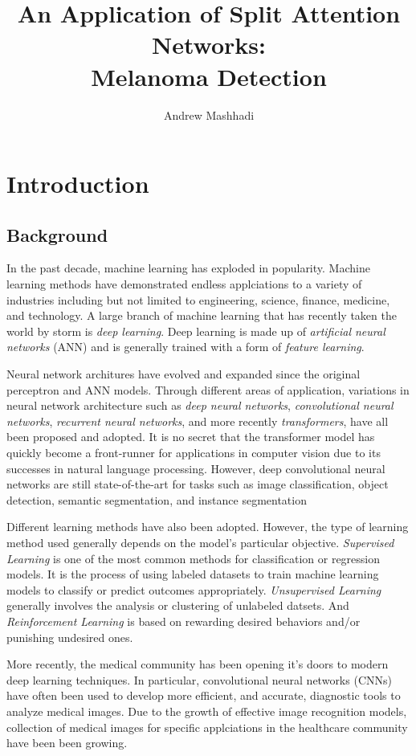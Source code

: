 \documentclass [MAS] {uclathes}
\title          {An Application of Split Attention Networks:\\
                Melanoma Detection}
\author         {Andrew Mashhadi}
\begin{document}
\makeintropages


\chapter{Introduction}

\section{Background}

In the past decade, machine learning has exploded in popularity. Machine learning methods have demonstrated endless applciations to a variety of industries including but not limited to engineering, science, finance, medicine, and technology. A large branch of machine learning that has recently taken the world by storm is \textit{deep learning}. Deep learning is made up of \textit{artificial neural networks} (ANN) and is generally trained with a form of \textit{feature learning}. 

Neural network architures have evolved and expanded since the original perceptron and ANN models. Through different areas of application, variations in neural network architecture such as \textit{deep neural networks}, \textit{convolutional neural networks}, \textit{recurrent neural networks}, and more recently \textit{transformers}, have all been proposed and adopted. It is no secret that the transformer model has quickly become a front-runner for applications in computer vision due to its successes in natural language processing. However, deep convolutional neural networks are still state-of-the-art for tasks such as image classification, object detection, semantic segmentation, and instance segmentation

Different learning methods have also been adopted. However, the type of learning method used generally depends on the model's particular objective. \textit{Supervised Learning} is one of the most common methods for classification or regression models. It is the process of using labeled datasets to train machine learning models to classify or predict outcomes appropriately. \textit{Unsupervised Learning} generally involves the analysis or clustering of unlabeled datsets. And \textit{Reinforcement Learning} is based on rewarding desired behaviors and/or punishing undesired ones.

More recently, the medical community has been opening it's doors to modern deep learning techniques. In particular, convolutional neural networks (CNNs) have often been used to develop more efficient, and accurate, diagnostic tools to analyze medical images. Due to the growth of effective image recognition models, collection of medical images for specific applciations in the healthcare community have been been growing. 
\end{document}
